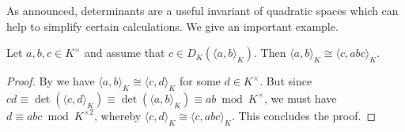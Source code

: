 \documentclass[12pt, leqno, british]{amsart}
\begin{document}
As announced, determinants are a useful invariant of quadratic spaces which can help to simplify certain calculations.
We give an important example.
\begin{prop}\label{P:binary-form-determinant}
Let $a, b, c \in K^\times$ and assume that $c \in D_K(\langle a, b \rangle_K)$.
Then $\langle a, b \rangle_K \cong \langle c, abc \rangle_K$.
\end{prop}
\begin{proof}
By  we have $\langle a, b \rangle_K \cong \langle c, d \rangle_K$ for some $d \in K^\times$.
But since $cd \equiv \det(\langle c, d \rangle_K) \equiv \det(\langle a, b \rangle_K) \equiv ab \bmod K^\times$, we must have $d \equiv abc \bmod K^{\times 2}$, whereby $\langle c, d \rangle_K \cong \langle c, abc \rangle_K$.
This concludes the proof.
\end{proof}
\end{document}
